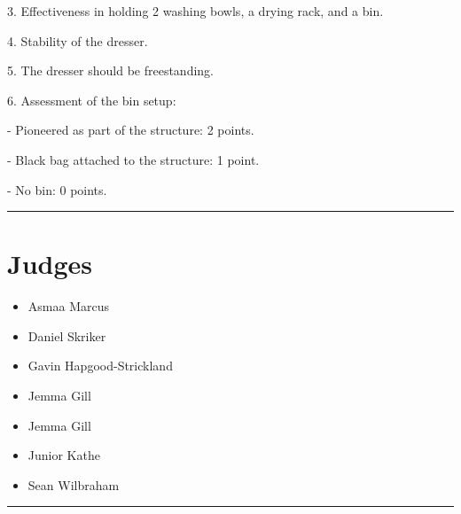 \documentclass[10pt]{article}
\begin{document}
3. Effectiveness in holding 2 washing bowls, a drying rack, and a bin.

4. Stability of the dresser.

5. The dresser should be freestanding.

6. Assessment of the bin setup:

   - Pioneered as part of the structure: 2 points.

   - Black bag attached to the structure: 1 point.

   - No bin: 0 points.
\vspace{0.5cm}
	\hrule
	\vspace{0.5cm}
		\section*{\faUsers \: Judges}

		

	\begin{multicols}{2}

		\begin{itemize}
									\item Asmaa Marcus
									\item Daniel Skriker
									\item Gavin Hapgood-Strickland
									\item Jemma Gill
						\end{itemize}

		\vfill\null
		\columnbreak

		\begin{itemize}
									\item Jemma Gill
									\item Junior Kathe
									\item Sean Wilbraham
						\end{itemize}

		\vfill\null

		\end{multicols}



			\vspace{0.5cm}
	\hrule
	\vspace{0.5cm}
\end{document}
